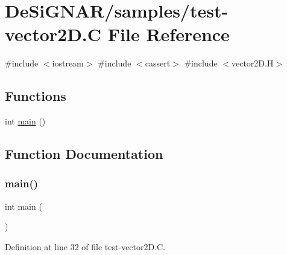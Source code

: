 \hypertarget{test-vector2_d_8_c}{}\section{De\+Si\+G\+N\+A\+R/samples/test-\/vector2D.C File Reference}
\label{test-vector2_d_8_c}
{\ttfamily \#include $<$iostream$>$}\newline
{\ttfamily \#include $<$cassert$>$}\newline
{\ttfamily \#include $<$vector2\+D.\+H$>$}\newline
\subsection*{Functions}
\begin{DoxyCompactItemize}
\item 
int \hyperlink{test-vector2_d_8_c_ae66f6b31b5ad750f1fe042a706a4e3d4}{main} ()
\end{DoxyCompactItemize}


\subsection{Function Documentation}
\mbox{\label{test-vector2_d_8_c_ae66f6b31b5ad750f1fe042a706a4e3d4}} 
\subsubsection{\texorpdfstring{main()}{main()}}
{\footnotesize\ttfamily int main (\begin{DoxyParamCaption}{ }\end{DoxyParamCaption})}



Definition at line 32 of file test-\/vector2\+D.\+C.

